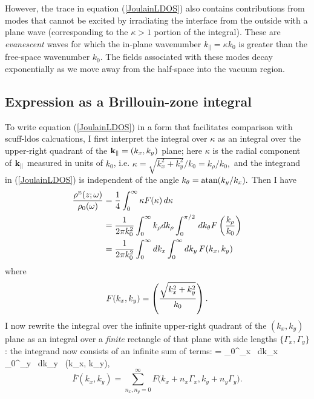 \documentclass[letterpaper]{article}
\begin{document}
However, the trace in equation (\ref{JoulainLDOS}) also contains
contributions from modes that cannot be excited by irradiating
the interface from the outside with a plane wave (corresponding
to the $\kappa>1$ portion of the integral). These are 
\textit{evanescent} waves for which the in-plane wavenumber
$k_\parallel=\kappa k_0$ is greater than the free-space wavenumber 
$k_0$. The fields associated with these modes decay exponentially
as we move away from the half-space into the vacuum region. 

\subsection*{Expression as a Brillouin-zone integral}

To write equation (\ref{JoulainLDOS}) in a form that facilitates
comparison with {\sc scuff-ldos} calcuations, I first interpret
the integral over $\kappa$ as an integral over the upper-right
quadrant of the $\mathbf{k}_\parallel=(k_x,k_y)$ plane; here
$\kappa$ is the radial component of $\mathbf{k}_\parallel$ measured in
units of $k_0$, i.e. $\kappa=\sqrt{k_x^2 + k_y^2}/k_0=k_\rho/k_0,$ 
and the integrand in (\ref{JoulainLDOS}) is independent of the 
angle $k_\theta=\text{atan}(k_y/k_x).$ Then I have
\begin{align*}
 \frac{\rho^{\hbox{\tiny{E}}}(z; \omega)}{\rho_0(\omega)}
  &=\frac{1}{4}\int_0^\infty \kappa F(\kappa) \, d\kappa
\\
  &=\frac{1}{2\pi k_0^2}
    \int_0^\infty k_\rho dk_\rho \int_0^{\pi/2} \, dk_\theta F\left(\frac{k_\rho}{k_0}\right)
\\
  &=\frac{1}{2\pi k_0^2}
    \int_0^\infty dk_x \int_0^\infty dk_y \, F(k_x, k_y)
\end{align*}
where 
$$ F(k_x, k_y)=\left(\frac{\sqrt{k_x^2 + k_y^2}}{k_0}\right).$$
I now rewrite the integral over the infinite upper-right
quadrant of the $(k_x,k_y)$ plane as an integral over a
\textit{finite} rectangle of that plane with side lengths 
$\{\Gamma_x, \Gamma_y\}$: the integrand now consists of an 
infinite sum of terms: 
{
  = 
    \int_0^{\Gamma_x} \, dk_x \, \int_0^{\Gamma_y} \, dk_y \,
    (k_x, k_y),
}
$$
    \overline{F}(k_x, k_y)=\sum_{n_x,n_y=0}^\infty 
              F\Big( k_x + n_x \Gamma_x, k_y + n_y\Gamma_y \Big).
$$
\end{document}
